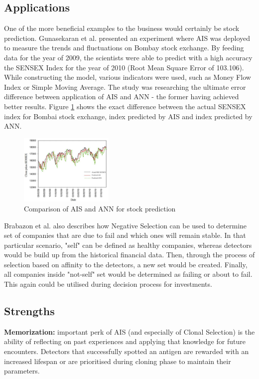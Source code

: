 \documentclass[letterpaper, 10 pt, conference]{ieeeconf}  %
\begin{document}
\subsection{Applications}
One of the more beneficial examples to the business would certainly be stock prediction. Gunasekaran et al. \cite{gunasekaran2011evaluation} presented an experiment where AIS was deployed to measure the trends and fluctuations on Bombay stock exchange. By feeding data for the year of 2009, the scientists were able to predict with a high accuracy the SENSEX Index for the year of 2010 (Root Mean Square Error of 103.106). While constructing the model, various indicators were used, such as Money Flow Index or Simple Moving Average. The study was researching the ultimate error difference between application of AIS and ANN - the former having achieved better results. Figure \ref{fig:stock} shows the exact difference between the actual SENSEX index for Bombai stock exchange, index predicted by AIS and index predicted by ANN. \newline
\begin{figure}[h!]
  \centering
  \includegraphics[width=0.4\textwidth]{graph}
  \caption{Comparison of AIS and ANN for stock prediction \cite{gunasekaran2011evaluation}}
  \label{fig:stock}
\end{figure}
Brabazon et al. \cite{brabazon2006biologically} also describes how Negative Selection can be used to determine set of companies that are due to fail and which ones will remain stable. In that particular scenario, "self" can be defined as healthy companies, whereas detectors would be build up from the historical financial data. Then, through the process of selection based on affinity to the detectors, a new set would be created. Finally, all companies inside "not-self" set would be determined as failing or about to fail. This again could be utilised during decision process for investments. 


\subsection{Strengths} 
\textbf{Memorization:} important perk of AIS (and especially of Clonal Selection) is the ability of reflecting on past experiences and applying that knowledge for future encounters. \cite{timmis2004overview} Detectors that successfully spotted an antigen are rewarded with an increased lifespan or are prioritised during cloning phase to maintain their parameters. 
\end{document}
